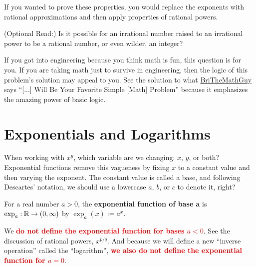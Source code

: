 If you wanted to prove these properties, you would replace the exponents with rational approximations and then apply properties of rational powers.


\begin{example} (Optional Read:) Is it possible for an irrational number raised to an irrational power to be a rational number, or even wilder, an integer?
\end{example}

\solution If you got into engineering because you think math is fun, this question is for you. If you are taking math just to survive in engineering, then the logic of this problem's solution may appeal to you. See the solution to what \href{https://youtu.be/4lvk7lYQ1RQ}{BriTheMathGuy} says ``[...] Will Be Your Favorite Simple [Math] Problem'' because it emphasizes the amazing power of basic logic.
\Qed

\section{Exponentials and Logarithms} 

When working with $x^y$, which variable are we changing: $x$, $y$, or both? Exponential functions remove this vagueness by fixing $x$ to a constant value and then varying the exponent. The constant value is called a base, and following Descartes' notation, we should use a lowercase $a$, $b$, or $c$ to denote it, right?

\begin{tcolorbox}[colback=mylightblue, title = {\bf Exponential Function of Base $a$}, breakable]
    \begin{definition} For a real number $a>0$, the \textbf{exponential function of base $\mathbf a$} is~ $\exp_a: \mathbb R \to (0, \infty)$ by $\exp_a(x):= a^x$.  
\end{definition}

\end{tcolorbox}

\bigskip

\begin{rem}
    We \textcolor{red}{\bf do not define the exponential function for bases $a < 0$}. See the discussion of rational powers, $x^{p/q}$. And because we will define a new ``inverse operation'' called the ``logarithm'', \textcolor{red}{\bf we also do not define the exponential function for $a=0$}. 
\end{rem}

